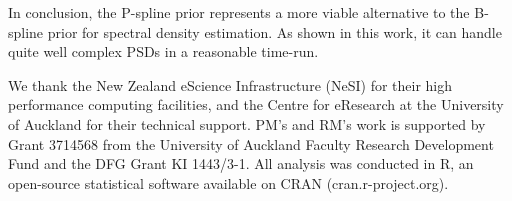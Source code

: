 \documentclass[aps,reprint,amsmath,amssymb,showpacs,showkeys]{revtex4-1}%
\begin{document}
In conclusion, the P-spline prior represents a more viable alternative to the B-spline prior for spectral density estimation.  As shown in this work, it can handle quite well complex PSDs in a reasonable time-run.\\

\begin{acknowledgements}
  We thank the New Zealand eScience Infrastructure (NeSI) for their high performance computing facilities, and the Centre for eResearch at the University of Auckland for their technical support. PM's and RM's work is supported by Grant 3714568 from the University of Auckland Faculty Research Development Fund and the DFG Grant KI 1443/3-1.  All analysis was conducted in \textsf{R}, an open-source statistical software available on \textsf{CRAN} (cran.r-project.org).
\end{acknowledgements}






\end{document}
